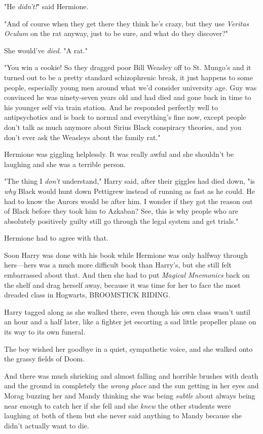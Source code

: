 "He \emph{didn't!}" said Hermione.

"And of course when they get there they think he's crazy, but they use
\emph{Veritas Oculum} on the rat anyway, just to be sure, and what do they
discover?"

She would've \emph{died}. "A rat."

"You win a cookie! So they dragged poor Bill Weasley off to St. Mungo's and it
turned out to be a pretty standard schizophrenic break, it just happens to some
people, especially young men around what we'd consider university age. Guy was
convinced he was ninety-seven years old and had died and gone back in time to
his younger self via train station. And he responded perfectly well to
antipsychotics and is back to normal and everything's fine now, except people
don't talk as much anymore about Sirius Black conspiracy theories, and you
don't ever ask the Weasleys about the family rat."

Hermione was giggling helplessly. It was really awful and she shouldn't be
laughing and she was a terrible person.

"The thing I \emph{don't} understand," Harry said, after their giggles had died
down, "is \emph{why} Black would hunt down Pettigrew instead of running as fast
as he could. He had to know the Aurors would be after him. I wonder if they got
the reason out of Black before they took him to Azkaban? See, this is why
people who are absolutely positively guilty still go through the legal system
and get trials."

Hermione had to agree with that.

Soon Harry was done with his book while Hermione was only halfway through
hers---hers was a much more difficult book than Harry's, but she still felt
embarrassed about that. And then she had to put \emph{Magical Mnemonics} back
on the shelf and drag herself away, because it was time for her to face the
most dreaded class in Hogwarts, BROOMSTICK RIDING.

Harry tagged along as she walked there, even though his own class wasn't until
an hour and a half later, like a fighter jet escorting a sad little propeller
plane on its way to its own funeral.

The boy wished her goodbye in a quiet, sympathetic voice, and she walked onto
the grassy fields of Doom.

And there was much shrieking and almost falling and horrible brushes with death
and the ground in completely the \emph{wrong place} and the sun getting in her
eyes and Morag buzzing her and Mandy thinking she was being \emph{subtle} about
always being near enough to catch her if she fell and she \emph{knew} the other
students were laughing at both of them but she never said anything to Mandy
because she didn't actually want to die.

